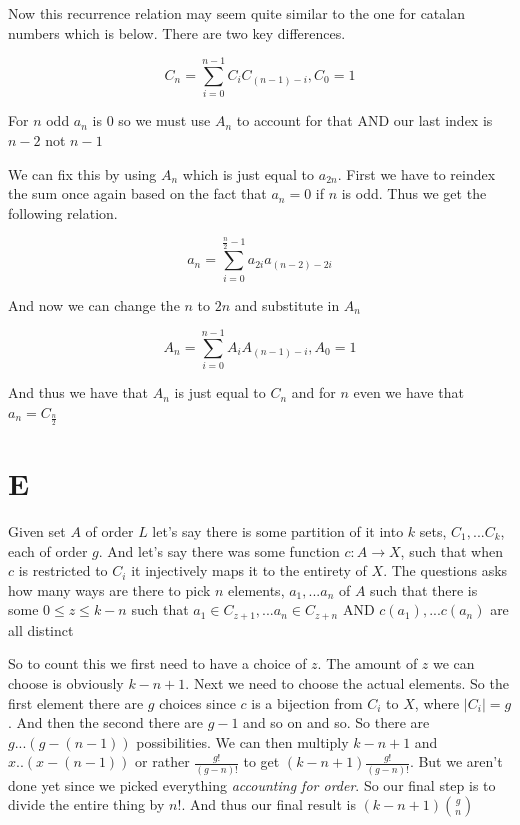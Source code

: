 \documentclass[paper=a4,fontsize=paper,12.5pt]{book}
\newcommand{\3}{\vspace*{3mm}}
\newcommand*{\comb}[2]{\binom{#1}{#2}}
\begin{document}
\3

Now this recurrence relation may seem quite similar to the one for catalan numbers which is below. There are two key differences. 

\[{C}_{n} = \sum\limits_{i = 0}^{n-1}{C}_{i}{C}_{(n-1) - i}, {C}_{0} = 1 \] 

For $n$ odd ${a}_{n}$ is $0$ so we must use ${A}_{n}$ to account for that AND our last index is $n-2$ not $n-1$

\3

We can fix this by using ${A}_{n}$ which is just equal to ${a}_{2n}$. First we have to reindex the sum once again based on the fact that ${a}_{n} = 0$ if $n$ is odd. Thus we get the following relation.

\[  {a}_{n} = \sum\limits_{i = 0}^{\frac{n}{2}-1}{a}_{2i}{a}_{(n-2) - 2i}\]

And now we can change the $n$ to $2n$ and substitute in ${A}_{n}$

\[ {A}_{n} = \sum\limits_{i = 0}^{n-1}{A}_{i}{A}_{(n-1) - i}, {A}_{0} = 1\] 

\3

And thus we have that ${A}_{n}$ is just equal to ${C}_{n}$ and for $n$ even we have that ${a}_{n} = {C}_{\frac{n}{2}}$


\3

\section*{E}

\3

Given set $A$ of order $L$ let's say there is some partition of it into $k$ sets, ${C}_{1}, ... {C}_{k}$, each of order $g$. And let's say there was some function $c: A \rightarrow X$, such that when $c$ is restricted to ${C}_{i}$ it injectively maps it to the entirety of $X$. The questions asks how many ways are there to pick $n$ elements, ${a}_{1}, ... {a}_{n}$ of $A$ such that there is some $0 \leq z \leq k -n$ such that ${a}_{1} \in {C}_{z+1}, ... {a}_{n} \in {C}_{z + n }$ AND $c({a}_{1}), ... c({a}_{n})$ are all distinct


\3

So to count this we first need to have a choice of $z$. The amount of $z$ we can choose is obviously $k -n +1$. Next we need to choose the actual elements. So the first element there are $g$ choices since $c$ is a bijection from ${C}_{i}$ to $X$, where $|{C}_{i}| = g$. And then the second there are $g -1$ and so on and so. So there are $g...(g - (n-1))$ possibilities. We can then multiply $k-n+1$ and $x..(x- (n-1))$ or rather $\frac{g!}{(g-n)!}$ to get $(k-n + 1)\frac{g!}{(g-n)!}$. But we aren't done yet since we picked everything \textit{accounting for order}. So our final step is to divide the entire thing by $n!$. And thus our final result is 
$(k-n + 1)\comb{g}{n}$
\end{document}
